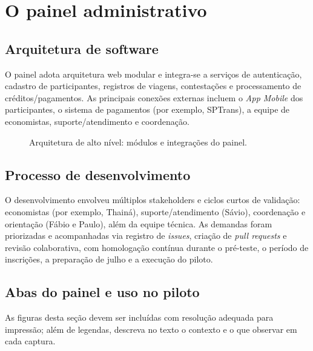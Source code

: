 
\chapter{O painel administrativo}
\label{cap:implementacao}

\section{Arquitetura de software}
O painel adota arquitetura web modular e integra-se a serviços de autenticação,
cadastro de participantes, registros de viagens, contestações e processamento de
créditos/pagamentos. As principais conexões externas incluem o \textit{App Mobile}
dos participantes, o sistema de pagamentos (por exemplo, SPTrans), a equipe de
economistas, suporte/atendimento e coordenação.

\begin{figure}[H]
  \centering
  \caption{Arquitetura de alto nível: módulos e integrações do painel.}
  \label{fig:arquitetura}
\end{figure}

\section{Processo de desenvolvimento}
O desenvolvimento envolveu múltiplos stakeholders e ciclos curtos de validação:
economistas (por exemplo, Thainá), suporte/atendimento (Sávio), coordenação e
orientação (Fábio e Paulo), além da equipe técnica. As demandas foram
priorizadas e acompanhadas via registro de \textit{issues}, criação de
\textit{pull requests} e revisão colaborativa, com homologação contínua durante
o pré-teste, o período de inscrições, a preparação de julho e a execução do
piloto.

\section{Abas do painel e uso no piloto}
As figuras desta seção devem ser incluídas com resolução adequada para
impressão; além de legendas, descreva no texto o contexto e o que observar em
cada captura.


